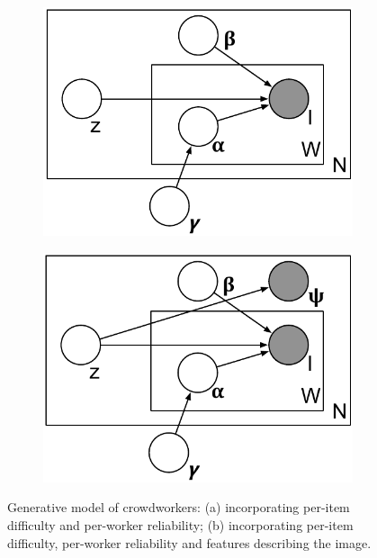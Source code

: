 \documentclass{../acm_proc_article-me11_tweaked}
\begin{document}
\begin{figure}[t]
\centering
\begin{subfigure}[t]{0.48\columnwidth}
	\centering
	\includegraphics[width=0.9\columnwidth]{images/model1}
	\caption{\label{fig:model1}}
\end{subfigure}
\begin{subfigure}[t]{0.48\columnwidth}
	\centering
	\includegraphics[width=0.9\columnwidth]{images/model2}
	\caption{\label{fig:model2}}
\end{subfigure}
\caption{Generative model of crowdworkers: (a) incorporating per-item difficulty and per-worker reliability; (b) incorporating per-item difficulty, per-worker reliability and features describing the image.}
\end{figure}
	
\end{document}
